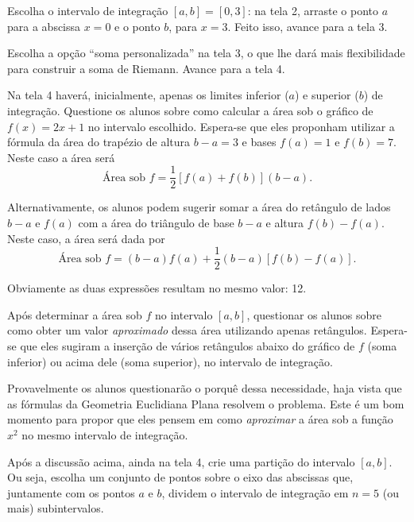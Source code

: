 \documentclass[a4paper,12pt]{scrartcl}
\begin{document}
\begin{list}{.}
      \item Escolha o intervalo de integração $[a,b]=[0,3]$: na tela 2, arraste o ponto $a$ para a abscissa $x = 0$ e o ponto $b$, para $x = 3$. Feito isso, avance para a tela 3.
      
      \item Escolha a opção ``soma personalizada'' na tela 3, o que lhe dará mais flexibilidade para construir a soma de Riemann. Avance para a tela 4.
      
      \item \label{step:area} Na tela 4 haverá, inicialmente, apenas os limites inferior ($a$) e superior ($b$) de integração. Questione os alunos sobre como calcular a área sob o gráfico de $f(x) = 2x + 1$ no intervalo escolhido. Espera-se que eles proponham utilizar a fórmula da área do trapézio de altura $b - a = 3$ e bases $f(a) = 1$ e $f(b) = 7$. Neste caso a área será
      \begin{equation*}
	\text{Área sob $f$} = \frac{1}{2}\left[f(a) + f(b)\right](b - a).
      \end{equation*}
      
      Alternativamente, os alunos podem sugerir somar a área do retângulo de lados $b - a$ e $f(a)$ com a área do triângulo de base $b - a$ e altura $f(b) - f(a)$. Neste caso, a área será dada por
      \begin{equation*}
       \text{Área sob $f$} = (b - a)f(a) + \frac{1}{2}(b - a)\left[f(b) - f(a)\right].
      \end{equation*}
      
      Obviamente as duas expressões resultam no mesmo valor: 12.

      \item Após determinar a área sob $f$ no intervalo $[a,b]$, questionar os alunos sobre como obter um valor \emph{aproximado} dessa área utilizando apenas retângulos. Espera-se que eles sugiram a inserção de vários retângulos abaixo do gráfico de $f$ (soma inferior) ou acima dele (soma superior), no intervalo de integração.
      
      Provavelmente os alunos questionarão o porquê dessa necessidade, haja vista que as fórmulas da Geometria Euclidiana Plana resolvem o problema.
      Este é um bom momento para propor que eles pensem em como \emph{aproximar} a área sob a função $x^2$ no mesmo intervalo de integração.
    
      \item Após a discussão acima, ainda na tela 4, crie uma partição do intervalo $[a,b]$. Ou seja, escolha um conjunto de pontos sobre o eixo das abscissas que, juntamente com os pontos $a$ e $b$, dividem o intervalo de integração em $n = 5$ (ou mais) subintervalos. 
      

\end{list}
\end{document}
